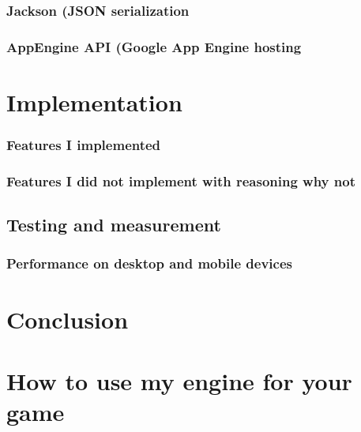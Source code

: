 \documentclass[11pt,oneside, final]{fithesis2}
\begin{document}
\subsection{Jackson (JSON serialization}
\subsection{AppEngine API (Google App Engine hosting}

\chapter{Implementation}
\subsection{Features I implemented}
\subsection{Features I did not implement with reasoning why not}

\section{Testing and measurement}
\subsection{Performance on desktop and mobile devices}

\chapter{Conclusion}


\appendix
\chapter{How to use my engine for your game}
\end{document}
